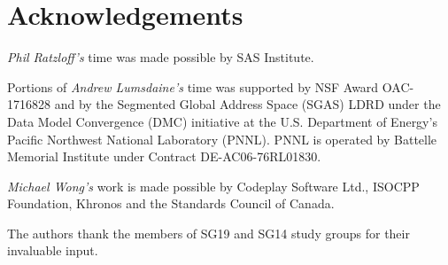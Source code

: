 
\section*{Acknowledgements}

\textit{Phil Ratzloff's} time was made possible by SAS Institute.

Portions of \textit{Andrew Lumsdaine's} time was supported by NSF Award OAC-1716828 and by the
Segmented Global Address Space (SGAS) LDRD under the Data Model Convergence (DMC)
initiative at the U.S. Department of Energy's Pacific Northwest National Laboratory
(PNNL). PNNL is operated by Battelle Memorial Institute under Contract
DE-AC06-76RL01830.

\textit{Michael Wong's} work is made possible by Codeplay Software Ltd., ISOCPP Foundation, Khronos and the Standards Council of Canada.  

The authors thank the members of SG19 and SG14 study groups for their invaluable input.
